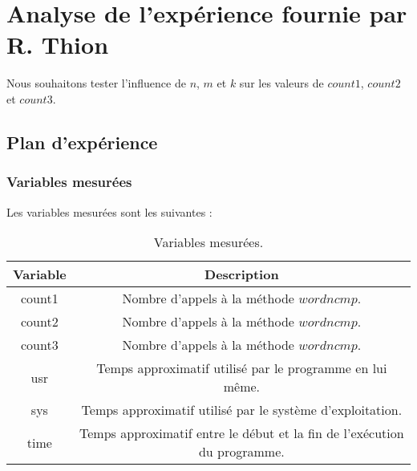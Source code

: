 
\section{Analyse de l'expérience fournie par R. Thion}

Nous souhaitons tester l'influence de $n$, $m$ et $k$ sur les valeurs de $count1$, $count2$ et $count3$.

\subsection{Plan d'expérience}

\subsubsection{Variables mesurées}

Les variables mesurées sont les suivantes :

\begin{table}[h!]
	\centering
	\caption{Variables mesurées.}
	\label{tab:variablesMesureesFournie}
	\begin{tabular}{c|c}
		\toprule
		Variable & Description\\
		\midrule
		count1 & Nombre d'appels à la méthode $wordncmp$.\\
		count2 & Nombre d'appels à la méthode $wordncmp$.\\
		count3 & Nombre d'appels à la méthode $wordncmp$.\\
		usr & Temps approximatif utilisé par le programme en lui même.\\
		sys & Temps approximatif utilisé par le système d'exploitation.\\
		time & Temps approximatif entre le début et la fin de l'exécution du programme.\\
		\bottomrule
	\end{tabular}
\end{table}

